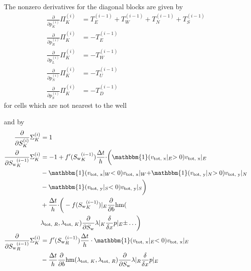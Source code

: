 \documentclass[conference]{IEEEtran}
\newcommand*{\indicator}{\ensuremath{\mathbb{1}}}
\newcommand*{\pdiff}[2]{\ensuremath{\frac{\partial}{\partial{#2}}{#1}}}
\newcommand*{\ddiff}[2]{\ensuremath{\frac{\delta}{\delta{#2}}{#1}}}
\renewcommand*{\indicator}{\ensuremath{\mathbbm{1}}}
\DeclareMathOperator*{\hmean}{hm}
\begin{document}
The nonzero derivatives for the diagonal blocks are given by
\begin{align}
\pdiff{\Pi_K^{(i)}}{p_K^{(i)}} &= T_E^{(i-1)} + T_W^{(i-1)} + T_N^{(i-1)} + T_S^{(i-1)} \\
\pdiff{\Pi_K^{(i)}}{p_R^{(i)}} &= -T_E^{(i-1)} \\
\pdiff{\Pi_K^{(i)}}{p_L^{(i)}} &= -T_W^{(i-1)} \\
\pdiff{\Pi_K^{(i)}}{p_N^{(i)}} &= -T_U^{(i-1)} \\
\pdiff{\Pi_K^{(i)}}{p_S^{(i)}} &= -T_D^{(i-1)}
\end{align}
for cells which are not nearest to the well

and by
\begin{align}
\pdiff{\Sigma_K^{(i)}}{S_K^{(i)}} &= 1 \\
\pdiff{\Sigma_K^{(i)}}{{S_{\text{w}}}_K^{(i-1)}} &=  -1 + f^\prime({S_{\text{w}}}_K^{(i-1)}) \frac{\Delta t}{h}\cdot \biggr(\indicator(v_\text{tot, x}\lvert_E > 0) v_\text{tot, x}\lvert_E \\&- \indicator(v_\text{tot, x}\lvert_W < 0) v_\text{tot, x}\lvert_W + \indicator(v_\text{tot, y}\lvert_N > 0) v_\text{tot, y}\lvert_N  \nonumber\\&- \indicator(v_\text{tot, y}\lvert_S < 0) v_\text{tot, y}\lvert_S\biggr) \nonumber\\ &+\frac{\Delta t}{h}\cdot\biggr(-f({S_{\text{w}}}_K^{(i-1)})\lvert_E \pdiff{\hmean}{b}(\nonumber\\&\lambda_{\text{tot, }R}, \lambda_{\text{tot, }K}) \pdiff{\lambda}{S_\text{w}}\lvert_K \ddiff{p}{x}\lvert_E\pm \ldots\biggr) \nonumber\\
\pdiff{\Sigma_K^{(i)}}{{S_{\text{w}}}_R^{(i-1)}} &= f^\prime({S_{\text{w}}}_R^{(i-1)}) \frac{\Delta t}{h}\cdot \indicator(v_\text{tot, x}\lvert_E < 0) v_\text{tot, x}\lvert_E \nonumber\\&- \frac{\Delta t}{h} \pdiff{\hmean}{b}(\lambda_{\text{tot, }K}, \lambda_{\text{tot, }R}) \pdiff{\lambda}{S_\text{w}}\lvert_R \ddiff{p}{x}\lvert_E
\end{align}
\end{document}
